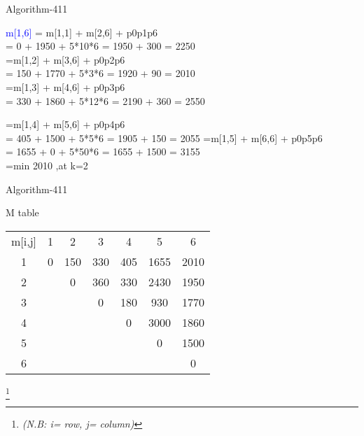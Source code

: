 \documentclass{beamer}
\begin{document}
\begin{frame}[t]{Algorithm-411}
\vspace{15 pt}

\textcolor{blue} {m[1,6]} = m[1,1] + m[2,6] + p0p1p6\\  = 0 + 1950 + 5*10*6 = 1950 + 300 = 2250\\
 =m[1,2] + m[3,6] + p0p2p6\\ = 150 + 1770 + 5*3*6 = 1920 + 90 = 2010  \\

 =m[1,3] + m[4,6] + p0p3p6\\ = 330 + 1860 + 5*12*6 = 2190 + 360 = 2550

 =m[1,4] + m[5,6] + p0p4p6\\ = 405 + 1500 + 5*5*6 = 1905 + 150 = 2055
 =m[1,5] + m[6,6] + p0p5p6\\ = 1655 + 0 + 5*50*6 = 1655 + 1500 = 3155\\
 
=min 2010 ,at k=2
\end{frame}


\begin{frame}[t]{Algorithm-411}
\vspace{15 pt}

\begin{block}
{M table } 
 
\begin{tabular}{ccccccc}
m[i,j] & 1& 2 &3 &4 &5 &6 \\
1 & 0 & 150 &330 &405 &1655 &2010 \\
2 &  &0 &360 &330 &2430 &1950 \\
3 &  &  &0 &180 &930 &1770 \\
4 &  &  &   &0  &3000 &1860 \\
5 &  &  &   &   &0   &1500 \\
6 &  &  &   &   &    &0 \\

\end{tabular}

\end{block}
\footnote{\textit{(N.B: i= row, j= column)}}


\end{frame}
\end{document}
